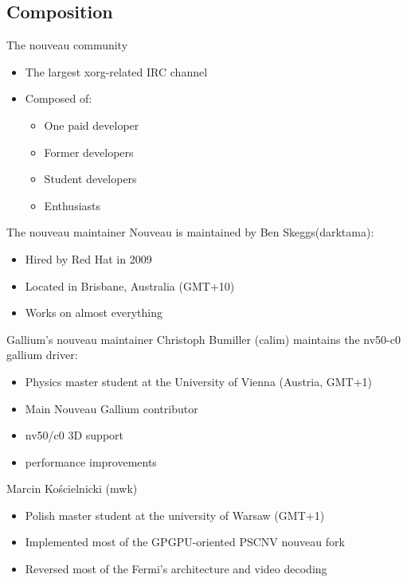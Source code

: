 \documentclass[11pt,english,compress]{beamer}
\begin{document}
	\subsection{Composition}
		\begin{frame}
			\begin{block}{The nouveau community}
				\begin{itemize}
					\item The largest xorg-related IRC channel
					\item Composed of:
						\begin{itemize}
							\item One paid developer
							\item Former developers
							\item Student developers
							\item Enthusiasts
						\end{itemize}
				\end{itemize}
			\end{block}

			\begin{block}{The nouveau maintainer}
				Nouveau is maintained by Ben Skeggs(darktama):
				\begin{itemize}
					\item Hired by Red Hat in 2009
					\item Located in Brisbane, Australia (GMT+10)
					\item Works on almost everything
				\end{itemize}
			\end{block}
		\end{frame}

		\begin{frame}
			\begin{block}{Gallium's nouveau maintainer}
				Christoph Bumiller (calim) maintains the nv50-c0 gallium driver:
				\begin{itemize}
					\item Physics master student at the University of Vienna (Austria, GMT+1)
					\item Main Nouveau Gallium contributor
					\item nv50/c0 3D support
					\item performance improvements
				\end{itemize}
			\end{block}

			\begin{block}{Marcin Kościelnicki (mwk)}
				\begin{itemize}
					\item Polish master student at the university of Warsaw (GMT+1)
					\item Implemented most of the GPGPU-oriented PSCNV nouveau fork
					\item Reversed most of the Fermi's architecture and video decoding
				\end{itemize}
			\end{block}
		\end{frame}
\end{document}
